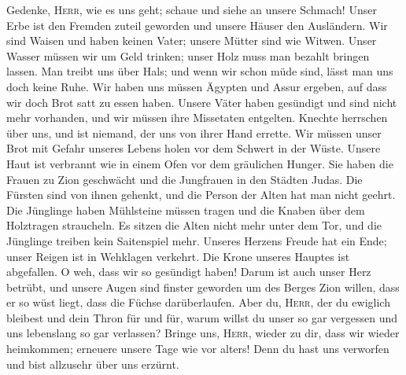  Gedenke, \textsc{Herr}, wie es uns geht; schaue und siehe
an unsere Schmach!  Unser Erbe ist den Fremden zuteil
geworden und unsere Häuser den Ausländern.  Wir sind
Waisen und haben keinen Vater; unsere Mütter sind wie Witwen.
 Unser Wasser müssen wir um Geld trinken; unser Holz muss
man bezahlt bringen lassen.  Man treibt uns über Hals; und
wenn wir schon müde sind, lässt man uns doch keine Ruhe. 
Wir haben uns müssen Ägypten und Assur ergeben, auf dass wir doch Brot
satt zu essen haben.  Unsere Väter haben gesündigt und
sind nicht mehr vorhanden, und wir müssen ihre Missetaten entgelten.
 Knechte herrschen über uns, und ist niemand, der uns von
ihrer Hand errette.  Wir müssen unser Brot mit Gefahr
unseres Lebens holen vor dem Schwert in der Wüste. 
Unsere Haut ist verbrannt wie in einem Ofen vor dem gräulichen Hunger.
 Sie haben die Frauen zu Zion geschwächt und die
Jungfrauen in den Städten Judas.  Die Fürsten sind von
ihnen gehenkt, und die Person der Alten hat man nicht geehrt.
 Die Jünglinge haben Mühlsteine müssen tragen und die
Knaben über dem Holztragen straucheln.  Es sitzen die
Alten nicht mehr unter dem Tor, und die Jünglinge treiben kein
Saitenspiel mehr.  Unseres Herzens Freude hat ein Ende;
unser Reigen ist in Wehklagen verkehrt.  Die Krone
unseres Hauptes ist abgefallen. O weh, dass wir so gesündigt haben!
 Darum ist auch unser Herz betrübt, und unsere Augen sind
finster geworden  um des Berges Zion willen, dass er so
wüst liegt, dass die Füchse darüberlaufen.  Aber du,
\textsc{Herr}, der du ewiglich bleibest und dein Thron für und für,
 warum willst du unser so gar vergessen und uns
lebenslang so gar verlassen?  Bringe uns, \textsc{Herr},
wieder zu dir, dass wir wieder heimkommen; erneuere unsere Tage wie vor
alters!  Denn du hast uns verworfen und bist allzusehr
über uns erzürnt.
